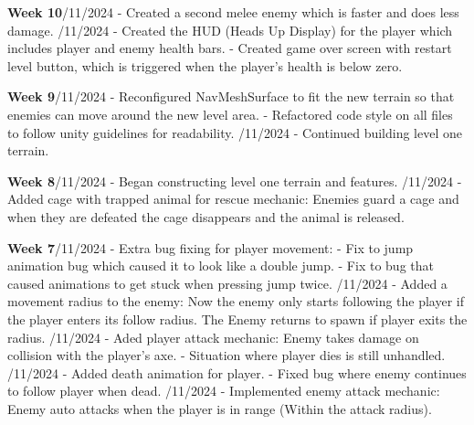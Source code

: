 \documentclass[]{final_report}
\begin{document}
\textbf{Week 10}/11/2024
\newline- Created a second melee enemy which is faster and does less damage.
/11/2024
\newline- Created the HUD (Heads Up Display) for the player which includes player and enemy health bars.
\newline- Created game over screen with restart level button, which is triggered when the player's health is below zero.
 
\textbf{Week 9}/11/2024
\newline- Reconfigured NavMeshSurface to fit the new terrain so that enemies can move around the new level area.
\newline- Refactored code style on all files to follow unity guidelines for readability.
/11/2024
\newline- Continued building level one terrain.

\textbf{Week 8}/11/2024
\newline- Began constructing level one terrain and features.
/11/2024
\newline- Added cage with trapped animal for rescue mechanic: Enemies guard a cage and when they are defeated the cage disappears and the animal is released.

\textbf{Week 7}/11/2024
\newline- Extra bug fixing for player movement:
\newline- Fix to jump animation bug which caused it to look like a double jump.
\newline- Fix to bug that caused animations to get stuck when pressing jump twice.
/11/2024
\newline- Added a movement radius to the enemy: Now the enemy only starts following the player if the player enters its follow radius. The Enemy returns to spawn if player exits the radius.
/11/2024
\newline- Aded player attack mechanic: Enemy takes damage on collision with the player's axe.
\newline- Situation where player dies is still unhandled.
/11/2024
\newline- Added death animation for player.
\newline- Fixed bug where enemy continues to follow player when dead.
/11/2024
\newline- Implemented enemy attack mechanic: Enemy auto attacks when the player is in range (Within the attack radius).
\end{document}
